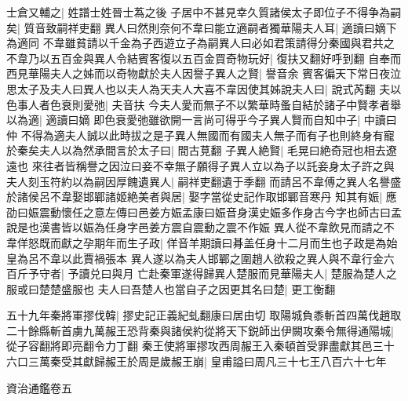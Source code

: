 士倉又輔之|{
	姓譜士姓晉士蒍之後}
子居中不甚見幸久質諸侯太子即位子不得争為嗣矣|{
	質音致嗣祥吏翻}
異人曰然則奈何不韋曰能立適嗣者獨華陽夫人耳|{
	適讀曰嫡下為適同}
不韋雖貧請以千金為子西遊立子為嗣異人曰必如君策請得分秦國與君共之不韋乃以五百金與異人令結賓客復以五百金買奇物玩好|{
	復扶又翻好呼到翻}
自奉而西見華陽夫人之姊而以奇物獻於夫人因譽子異人之賢|{
	譽音余}
賓客徧天下常日夜泣思太子及夫人曰異人也以夫人為天夫人大喜不韋因使其姊說夫人曰|{
	說式芮翻}
夫以色事人者色衰則愛弛|{
	夫音扶}
今夫人愛而無子不以繁華時蚤自結於諸子中賢孝者舉以為適|{
	適讀曰嫡}
即色衰愛弛雖欲開一言尚可得乎今子異人賢而自知中子|{
	中讀曰仲}
不得為適夫人誠以此時拔之是子異人無國而有國夫人無子而有子也則終身有寵於秦矣夫人以為然承間言於太子曰|{
	間古莧翻}
子異人絶賢|{
	毛晃曰絶奇冠也相去遼遠也}
來往者皆稱譽之因泣曰妾不幸無子願得子異人立以為子以託妾身太子許之與夫人刻玉符約以為嗣因厚餽遺異人|{
	嗣祥吏翻遺于季翻}
而請呂不韋傅之異人名譽盛於諸侯呂不韋娶邯鄲諸姬絶美者與居|{
	娶字當從史記作取邯鄲音寒丹}
知其有娠|{
	應劭曰娠震動懷任之意左傳曰邑姜方娠孟康曰娠音身漢史娠多作身古今字也師古曰孟說是也漢書皆以娠為任身字邑姜方震自震動之震不作娠}
異人從不韋飲見而請之不韋佯怒既而獻之孕期年而生子政|{
	佯音羊期讀曰朞盖任身十二月而生也子政是為始皇為呂不韋以此賈禍張本}
異人遂以為夫人邯鄲之圍趙人欲殺之異人與不韋行金六百斤予守者|{
	予讀兑曰與月}
亡赴秦軍遂得歸異人楚服而見華陽夫人|{
	楚服為楚人之服或曰楚楚盛服也}
夫人曰吾楚人也當自子之因更其名曰楚|{
	更工衡翻}


五十九年秦將軍摎伐韓|{
	摎史記正義紀虬翻康曰居由切}
取陽城負黍斬首四萬伐趙取二十餘縣斬首虜九萬赧王恐背秦與諸侯約從將天下鋭師出伊闕攻秦令無得通陽城|{
	從子容翻將即亮翻令力丁翻}
秦王使將軍摎攻西周赧王入秦頓首受罪盡獻其邑三十六口三萬秦受其獻歸赧王於周是歲赧王崩|{
	皇甫謚曰周凡三十七王八百六十七年}


資治通鑑卷五
